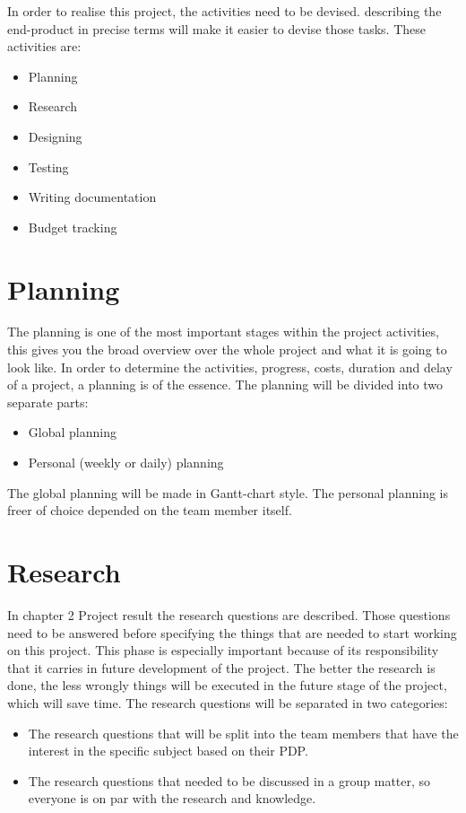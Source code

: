 In order to realise this project, the activities need to be devised. describing the end-product in precise terms will make it easier to devise those tasks. These activities are: 

\begin{itemize}
	\setlength\itemsep{-0.2em}
	\item Planning
	\item Research
	\item Designing
	\item Testing
	\item Writing documentation
	\item Budget tracking
\end{itemize}


	\section{Planning}
	
The planning is one of the most important stages within the project activities, this gives you the broad overview over the whole project and what it is going to look like. In order to determine the activities, progress, costs, duration and delay of a project, a planning is of the essence. 
The planning will be divided into two separate parts:

\begin{itemize}
	\setlength\itemsep{-0.2em}
	\item Global planning
	\item Personal (weekly or daily) planning
\end{itemize}
\noindent
The global planning will be made in Gantt-chart style. The personal planning is freer of choice depended on the team member itself.
	
	
	\section{Research}
	
In chapter 2 Project result the research questions are described. Those questions need to be answered before specifying the things that are needed to start working on this project. This phase is especially important because of its responsibility that it carries in future development of the project. The better the research is done, the less wrongly things will be executed in the future stage of the project, which will save time. 
The research questions will be separated in two categories: 

\begin{itemize}
	\setlength\itemsep{-0.2em}
	\item The research questions that will be split into the team members that have the interest in the specific subject based on their PDP.
	\item The research questions that needed to be discussed in a group matter, so everyone is on par with the research and knowledge.
\end{itemize}


